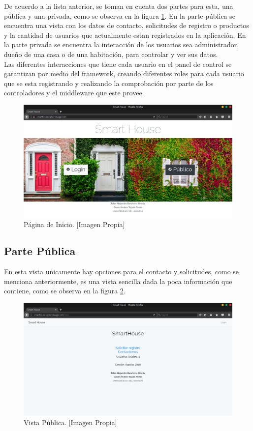 De acuerdo a la lista anterior, se toman en cuenta dos partes para esta, una pública y una privada, como se observa en la figura \ref{fig:index}. En la parte pública se encuentra una vista con los datos de contacto, solicitudes de registro o productos y la cantidad de usuarios que actualmente estan registrados en la aplicación. En la parte privada se encuentra la interacción de los usuarios sea administrador, dueño de una casa o de una habitación, para controlar y ver sus datos.\\

Las diferentes interacciones que tiene cada usuario en el panel de control se garantizan por medio del framework, creando diferentes roles para cada usuario que se esta registrando y realizando la comprobación por parte de los controladores y el middleware que este provee.\\

\begin{figure}[H]
\centering
\caption{Página de Inicio. [Imagen Propia]}
\label{fig:index}
\includegraphics[width=0.5\linewidth]{Imagenes/Index}
\end{figure}

\subsection{Parte Pública}

En esta vista unicamente hay opciones para el contacto y solicitudes, como se menciona anteriormente, es una vista sencilla dada la poca información que contiene, como se observa en la figura \ref{fig:publicview}.

\begin{figure}[H]
\centering
\caption{Vista Pública. [Imagen Propia]}
\label{fig:publicview}
\includegraphics[width=0.5\linewidth]{Imagenes/Public_view}
\end{figure}

